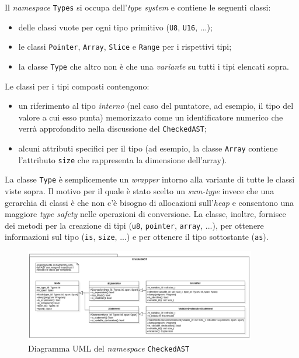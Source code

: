 Il \textit{namespace} \texttt{Types} si occupa dell'\emph{type system} e contiene le seguenti classi:
\begin{itemize}
	\item delle classi vuote per ogni tipo primitivo (\texttt{U8}, \texttt{U16}, ...);
	\item le classi \texttt{Pointer}, \texttt{Array}, \texttt{Slice} e \texttt{Range} per i rispettivi tipi;
	\item la classe \texttt{Type} che altro non \`e che una \textit{variante} su tutti i tipi elencati sopra.
\end{itemize}
Le classi per i tipi composti contengono:
\begin{itemize}
	\item un riferimento al tipo \textit{interno} (nel caso del puntatore, ad esempio, il tipo del valore a cui esso punta) memorizzato come un identificatore numerico che verr\`a approfondito nella discussione del \texttt{CheckedAST};
	\item alcuni attributi specifici per il tipo (ad esempio, la classe \texttt{Array} contiene l'attributo \texttt{size} che rappresenta la dimensione dell'array).
\end{itemize}
La classe \texttt{Type} \`e semplicemente un \textit{wrapper} intorno alla variante di tutte le classi viste sopra. Il motivo per il quale \`e stato scelto un \textit{sum-type} invece che una gerarchia di classi \`e che non c'\`e bisogno di allocazioni sull'\textit{heap} e consentono una maggiore \textit{type safety} nelle operazioni di conversione. La classe, inoltre, fornisce dei metodi per la creazione di tipi (\texttt{u8}, \texttt{pointer}, \texttt{array}, ...), per ottenere informazioni sul tipo (\texttt{is}, \texttt{size}, ...) e per ottenere il tipo sottostante (\texttt{as}).

\begin{figure}[H]
	\centering
	\includegraphics[width=0.9\textwidth]{figures/checked_ast.png}
	\caption{Diagramma UML del \textit{namespace} \texttt{CheckedAST}}
	\label{fig:checked-ast-uml}
\end{figure}

